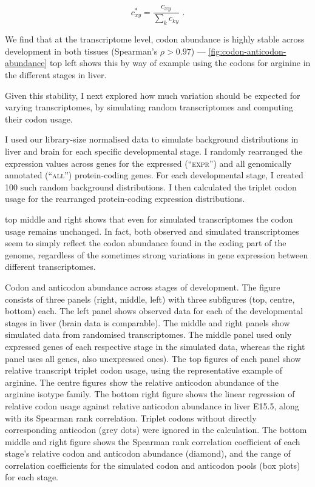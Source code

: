 \begin{equation}
    c_{xy}^* = \frac{c_{xy}}{\sum_k c_{ky}} \text{\ .}
\end{equation}

We find that at the transcriptome level, codon abundance is highly stable across
development in both tissues (Spearman’s \(\rho > 0.97\)) ---
\cref{fig:codon-anticodon-abundance} top left shows this by way of example using
the codons for arginine in the different stages in liver.

Given this stability, I next explored how much variation should be expected for
varying transcriptomes, by simulating random transcriptomes and computing their
codon usage.

I used our library-size normalised \rnaseq data to simulate background
distributions in liver and brain for each specific developmental stage. I
randomly rearranged the expression values across genes for the expressed
(“\textsc{expr}”) and all genomically annotated (“\textsc{all}”) protein-coding
genes. For each developmental stage, I created \num{100} such random background
distributions. I then calculated the triplet codon usage for the rearranged
protein-coding \rna expression distributions.

 top middle and right shows that even for
simulated transcriptomes the codon usage remains unchanged. In fact, both
observed and simulated transcriptomes seem to simply reflect the codon abundance
found in the coding part of the genome, regardless of the sometimes strong
variations in gene expression between different transcriptomes.

\begingroup
\renewcommand*\floatpos{H}
    {Codon and anticodon abundance across stages of development.}
    {The figure consists of three panels (right, middle, left) with three
    subfigures (top, centre, bottom) each. The left panel shows observed data
    for each of the developmental stages in liver (brain data is comparable).
    The middle and right panels show simulated data from randomised
    transcriptomes. The middle panel used only expressed genes of each
    respective stage in the simulated data, whereas the right panel uses all
    genes, also unexpressed ones). The top figures of each panel show relative
    \mrna transcript triplet codon usage, using the representative example of
    arginine. The centre figures show the relative \trna anticodon abundance of
    the arginine isotype family. The bottom right figure shows the linear
    regression of relative codon usage against relative anticodon abundance in
    liver E15.5, along with its Spearman rank correlation. Triplet codons
    without directly corresponding anticodon (grey dots) were ignored in the
    calculation. The bottom middle and right figure shows the Spearman rank
    correlation coefficient of each stage’s relative codon and anticodon
    abundance (diamond), and the range of correlation coefficients for the
    simulated codon and anticodon pools (box plots) for each stage.}
\endgroup

